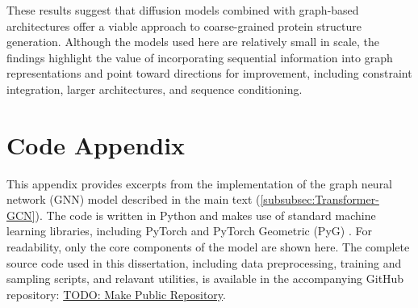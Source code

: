 \documentclass[a4paper,12pt]{article}
\begin{document}
These results suggest that diffusion models combined with graph-based architectures offer a viable approach to coarse-grained protein structure generation. Although the models used here are relatively small in scale, the findings highlight the value of incorporating sequential information into graph representations and point toward directions for improvement, including constraint integration, larger architectures, and sequence conditioning.

\clearpage

\appendix
\section{Code Appendix}
This appendix provides excerpts from the implementation of the graph neural network (GNN) model described in the main text (\cref{subsubsec:Transformer-GCN}). The code is written in Python and makes use of standard machine learning libraries, including PyTorch and PyTorch Geometric (PyG) \citep{PyG1.0,PyG2.0}. For readability, only the core components of the model are shown here. The complete source code used in this dissertation, including data preprocessing, training and sampling scripts, and relavant utilities, is available in the accompanying GitHub repository: \url{TODO: Make Public Repository}.
\end{document}
